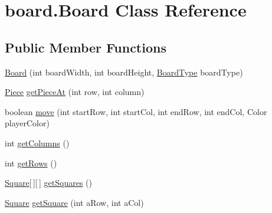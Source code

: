 \hypertarget{classboard_1_1_board}{\section{board.\-Board Class Reference}
\label{classboard_1_1_board}
}
\subsection*{Public Member Functions}
\begin{DoxyCompactItemize}
\item 
\hyperlink{classboard_1_1_board_a3dc277f7d2c22ce8d90dd98c9301371d}{Board} (int board\-Width, int board\-Height, \hyperlink{enumenums_1_1_board_type}{Board\-Type} board\-Type)
\item 
\hyperlink{classpieces_1_1_piece}{Piece} \hyperlink{classboard_1_1_board_adcfe685a47776e1aaab004b0dbdb55ee}{get\-Piece\-At} (int row, int column)
\item 
boolean \hyperlink{classboard_1_1_board_a4494901eef890f371c30e8656c5c1d77}{move} (int start\-Row, int start\-Col, int end\-Row, int end\-Col, Color player\-Color)
\item 
int \hyperlink{classboard_1_1_board_a6b17aec4022d0a4314393d246c3d48f3}{get\-Columns} ()
\item 
int \hyperlink{classboard_1_1_board_a0c300f5c0399ec83a4065663a35ac9e9}{get\-Rows} ()
\item 
\hyperlink{classboard_1_1_square}{Square}\mbox{[}$\,$\mbox{]}\mbox{[}$\,$\mbox{]} \hyperlink{classboard_1_1_board_aec5c6e50e5a17970d69809f8b87a648a}{get\-Squares} ()
\item 
\hyperlink{classboard_1_1_square}{Square} \hyperlink{classboard_1_1_board_afa9b4609be24b62dc2d9b0c69a10446b}{get\-Square} (int a\-Row, int a\-Col)
\end{DoxyCompactItemize}


